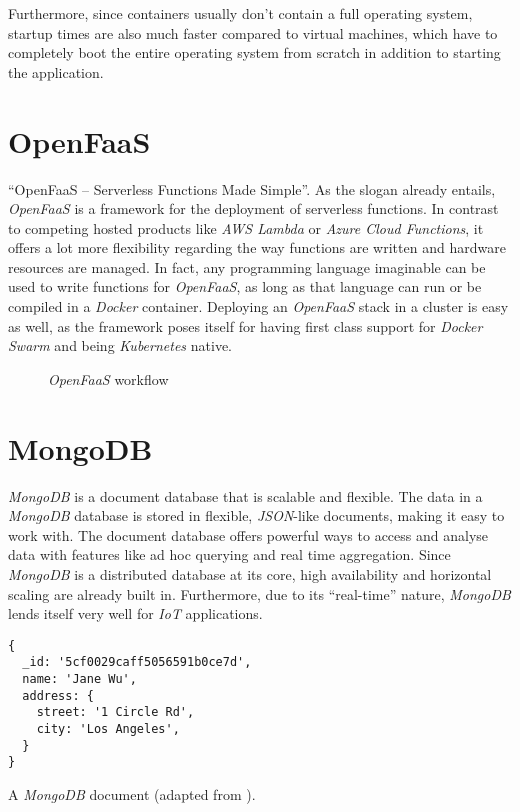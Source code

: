 Furthermore, since containers usually don't contain a full operating system, startup times are also
much faster compared to virtual machines, which have to completely boot the entire operating system
from scratch in addition to starting the application. \cite{docker-container}

\section{OpenFaaS}

“OpenFaaS – Serverless Functions Made Simple”. As the slogan already entails, \textit{OpenFaaS} is a
framework for the deployment of serverless functions. In contrast to competing hosted products like
\textit{AWS Lambda} or \textit{Azure Cloud Functions}, it offers a lot more flexibility regarding
the way functions are written and hardware resources are managed. In fact, any programming language
imaginable can be used to write functions for \textit{OpenFaaS}, as long as that language can run or
be compiled in a \textit{Docker} container. Deploying an \textit{OpenFaaS} stack in a cluster is
easy as well, as the framework poses itself for having first class support for \textit{Docker Swarm}
and being \textit{Kubernetes} native. \cite{openfaas-docs}

\begin{figure}[H]
  \centering
  \caption{\textit{OpenFaaS} workflow \cite{openfaas-docs}}
\end{figure}

\section{MongoDB}

\textit{MongoDB} is a document database that is scalable and flexible. The data in a
\textit{MongoDB} database is stored in flexible, \textit{JSON}-like documents, making it easy to
work with. The document database offers powerful ways to access and analyse data with features like
ad hoc querying and real time aggregation. Since \textit{MongoDB} is a distributed database at its
core, high availability and horizontal scaling are already built in. Furthermore, due to its
“real-time” nature, \textit{MongoDB} lends itself very well for \textit{IoT} applications.
\cite{mongodb-description}

\begin{code}[H]
  \centering
  \begin{lstlisting}[basicstyle=\small]
{
  _id: '5cf0029caff5056591b0ce7d',
  name: 'Jane Wu',
  address: {
    street: '1 Circle Rd',
    city: 'Los Angeles',
  }
}
  \end{lstlisting}
  \caption{A \textit{MongoDB} document (adapted from \cite{mongodb-description}).}
\end{code}

